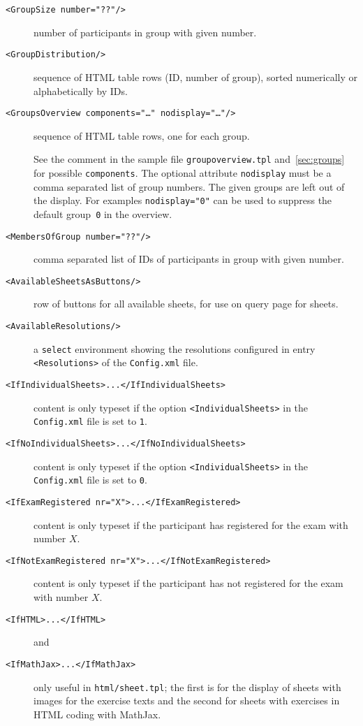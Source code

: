 \documentclass[12pt,openany,a4paper]{book}
\begin{document}
\begin{description}
\item[\texttt{<GroupSize number="??"/>}] number of participants in group
with given number.
\item[\texttt{<GroupDistribution/>}] sequence of HTML table rows (ID, number of
group), sorted numerically or alphabetically by IDs.
\item[\texttt{<GroupsOverview components="\ldots" nodisplay="\ldots"/>}] 
sequence of HTML table rows, one for each group. 

See the comment in the sample file
\texttt{groupoverview.tpl} and~\ref{sec:groups} 
for possible \texttt{components}. The optional attribute \texttt{nodisplay}
must be a comma separated list of group numbers. The given groups are left
out of the display. For examples \texttt{nodisplay="0"} can be used to
suppress the default group~\texttt{0} in the overview.
\item[\texttt{<MembersOfGroup number="??"/>}] comma separated list of IDs of 
participants in group with given number.
\item[\texttt{<AvailableSheetsAsButtons/>}] row of buttons for all available
sheets,  for use on query page for sheets.
\item[\texttt{<AvailableResolutions/>}] a \texttt{select} environment
showing the resolutions configured in entry \texttt{<Resolutions>} of the
\texttt{Config.xml} file.
\item[\texttt{<IfIndividualSheets>...</IfIndividualSheets>}] 
content is only typeset if the option \texttt{<IndividualSheets>} in the 
\texttt{Config.xml} file is set to \texttt{1}.
\item[\texttt{<IfNoIndividualSheets>...</IfNoIndividualSheets>}] 
content is only typeset if the option \texttt{<IndividualSheets>} in the 
\texttt{Config.xml} file is set to \texttt{0}.
\item[\texttt{<IfExamRegistered nr="X">...</IfExamRegistered>}]
content is only typeset if the participant has registered for the exam
with number $X$.
\item[\texttt{<IfNotExamRegistered nr="X">...</IfNotExamRegistered>}]
content is only typeset if the participant has not registered for the exam
with number $X$.
\item[\texttt{<IfHTML>...</IfHTML>}] and \item[\texttt{<IfMathJax>...</IfMathJax>}]
only useful in \texttt{html/sheet.tpl}; the first is for the display of
sheets with images for the exercise texts and the second for sheets with
exercises in HTML coding with MathJax.
\end{description}
\end{document}
